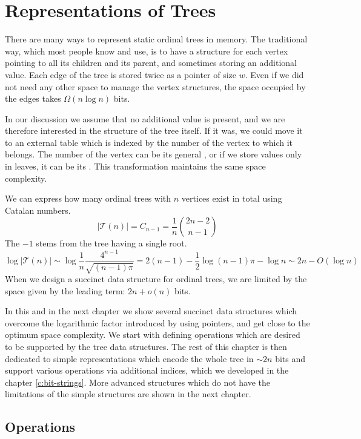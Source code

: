 \chapter{Representations of Trees}

There are many ways to represent static ordinal trees in memory.
The traditional way, which most people know and use, is to have a structure for each vertex pointing to all its children and its parent, and sometimes storing an additional value.
Each edge of the tree is stored twice as a pointer of size $w$.
Even if we did not need any other space to manage the vertex structures, the space occupied by the edges takes $\Omega (n \log n)$ bits.

In our discussion we assume that no additional value is present, and we are therefore interested in the structure of the tree itself.
If it was, we could move it to an external table which is indexed by the number of the vertex to which it belongs.
The number of the vertex can be its general \rank{}, or if we store values only in leaves, it can be its \leafRank{}.
This transformation maintains the same space complexity.

We can express how many ordinal trees with $n$ vertices exist in total using Catalan numbers.
$$ | \mathcal{T}(n) | = C_{n-1} = \frac{1}{n} {2n - 2 \choose n - 1} $$
The $-1$ stems from the tree having a single root.
$$ \log | \mathcal{T}(n) | \sim \log \frac{1}{n}\frac{4^{n-1}}{\sqrt{(n-1)\pi}} = 2(n - 1) - \frac{1}{2} \log{(n - 1)\pi} - \log n \sim 2n - O(\log n) $$
When we design a succinct data structure for ordinal trees, we are limited by the space given by the leading term: $2n + o(n)$ bits.

In this and in the next chapter we show several succinct data structures which overcome the logarithmic factor introduced by using pointers, and get close to the optimum space complexity.
We start with defining operations which are desired to be supported by the tree data structures.
The rest of this chapter is then dedicated to simple representations which encode the whole tree in $\sim 2n$ bits and support various operations via additional indices, which we developed in the chapter \ref{c:bit-strings}.
More advanced structures which do not have the limitations of the simple structures are shown in the next chapter.

\section{Operations}

